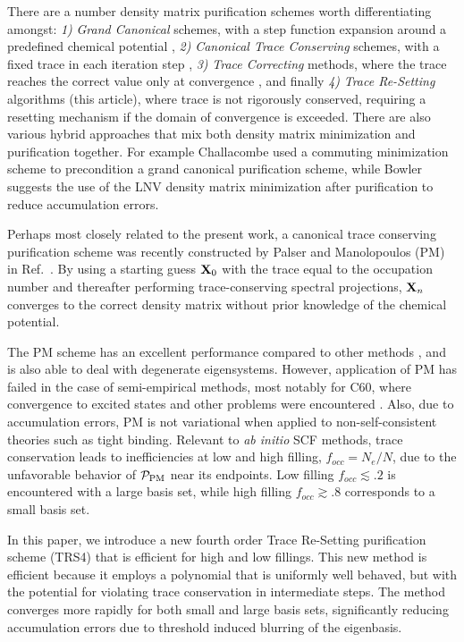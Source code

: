 \commentoutA{\documentclass[prb,aps,twocolumn,twocolumngrid,secnumarabic]{revtex4}}
\begin{document}
There are a number density matrix purification schemes worth differentiating amongst: 
{\it 1)} {\it Grand Canonical} schemes, with a step function  expansion around a predefined 
         chemical potential \cite{RMcWeeny60,AHolas01},
{\it 2)} {\it Canonical Trace Conserving} schemes, with a fixed trace
         in each iteration step \cite{APalser99}, 
{\it 3)} {\it Trace Correcting} methods, where the trace reaches the correct value only at 
         convergence \cite{ANiklasson02B}, and finally 
{\it 4)} {\it Trace Re-Setting} algorithms (this article), where trace is not rigorously conserved,
          requiring a resetting  mechanism if the domain of convergence is exceeded.
There are also various hybrid approaches that mix both density matrix minimization and 
purification together.  For example Challacombe\cite{MChallacombe99} used a commuting 
 minimization scheme to precondition a grand canonical purification scheme,
while Bowler \cite{DBowler99} suggests the use of the LNV density matrix minimization 
after purification to reduce accumulation errors.

Perhaps most closely related to the present work, a canonical trace 
conserving purification scheme was recently constructed by Palser and Manolopoulos 
(PM) in Ref.~. 
By using a starting guess ${\bf X}_0$ with the trace equal to 
the occupation number and thereafter performing trace-conserving
spectral projections, ${\bf X}_n$ converges to the correct density matrix without
prior knowledge of the chemical potential. 

The PM scheme has an excellent performance compared to other methods \cite{APalser99,ADaniels99}, and is also
able to deal with degenerate eigensystems.  However, application of PM has failed in the case of 
semi-empirical methods, most notably for C60, where convergence to excited states and other problems
were encountered \cite{ADaniels99}.   Also, due to accumulation errors, PM is 
not variational when applied to non-self-consistent theories such as tight binding\cite{DBowler99}.
Relevant to {\it ab initio} SCF methods, trace conservation leads to  inefficiencies at low 
and high filling, $f_{occ}=N_e/N$, due to the unfavorable behavior of ${\cal P}_{\rm PM}$ near 
its endpoints.  Low filling $f_{occ}\lesssim .2$  is encountered 
with a large basis set, while high filling $f_{occ} \gtrsim .8$ corresponds to a small basis set.

In this paper, we introduce a new fourth order Trace Re-Setting purification scheme (TRS4) 
that is efficient for high and low fillings.  This new method is 
efficient because it employs a polynomial that is uniformly well behaved, but with the
potential for violating trace conservation in intermediate steps.  The method
converges more rapidly for both small and large basis sets, significantly reducing 
accumulation errors due to threshold induced blurring of the eigenbasis.
\end{document}

